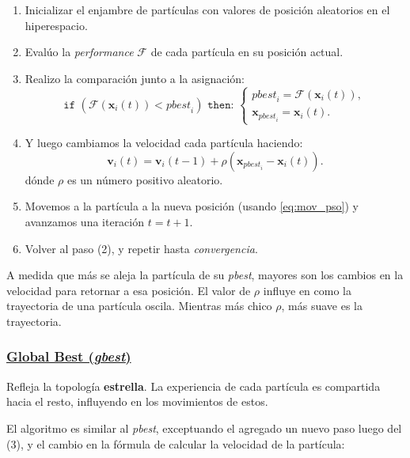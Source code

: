 \documentclass[10pt,a4paper]{article}
\begin{document}
\begin{enumerate}
\item Inicializar el enjambre de partículas con valores de posición aleatorios en el hiperespacio.
\item Evalúo la \textit{performance} $\mathcal{F}$ de cada partícula en su posición actual.
\item Realizo la comparación junto a la asignación:
\[
	\texttt{if } \left( \mathcal{F} (\mathbf{x}_i(t)) < \textit{pbest}_i \right) \texttt{ then: } \left\{
	\begin{array}{l}
	\textit{pbest}_i = \mathcal{F}(\mathbf{x}_i(t)),\\
	\mathbf{x}_{\textit{pbest}_i} = \mathbf{x}_i(t).
	\end{array}
	\right.
\]
\item Y luego cambiamos la velocidad cada partícula haciendo:
\[
\mathbf{v}_{i}(t) = \mathbf{v}_{i}(t-1) + \rho(\mathbf{x}_{\textit{pbest}_i}- \mathbf{x}_i(t)).
\]
dónde $\rho$ es un número positivo aleatorio.
\item Movemos a la partícula a la nueva posición (usando \ref{eq:mov_pso}) y avanzamos una iteración $t=t+1$.
\item Volver al paso (2), y repetir hasta \textit{convergencia}.
\end{enumerate}

A medida que más se aleja la partícula de su \textit{pbest}, mayores son los cambios en la velocidad para retornar a esa posición. El valor de $\rho$ influye en como la trayectoria de una partícula oscila. Mientras más chico $\rho$, más suave es la trayectoria.

\subsubsection*{\underline{{Global Best (\textit{gbest})}}}

Refleja la topología \textbf{estrella}. La experiencia de cada partícula es compartida hacia el resto, influyendo en los movimientos de estos.

El algoritmo es similar al \textit{pbest}, exceptuando el agregado un nuevo paso luego del (3), y el cambio en la fórmula de calcular la velocidad de la partícula:
\end{document}
